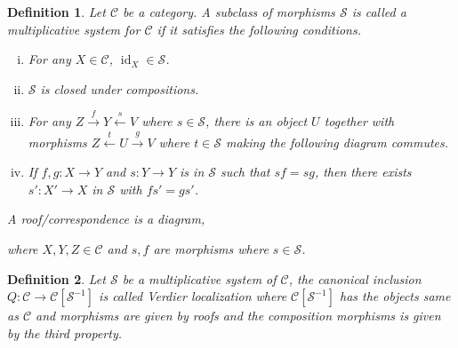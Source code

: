 \documentclass[10pt]{article}
\numberwithin{equation}{section}
\newtheorem{definition}{Definition}[section]
\DeclareMathOperator{\id}{id}
\newcommand{\sC}[0]{\mathscr{C}}
\begin{document}
\begin{definition}
    Let $\sC$ be a category. A subclass of morphisms $\mathcal{S}$ is called a multiplicative system for $\sC$ if it satisfies the following conditions.
    \begin{enumerate}[i. ]
        \item For any $X\in\sC$, $\id_X\in\mathcal{S}$.
        \item $\mathcal{S}$ is closed under compositions.
        \item For any $Z\stackrel{f}{\rightarrow}Y\stackrel{s}{\leftarrow}V$ where $s\in\mathcal{S}$, there is an object $U$ together with morphisms $Z\stackrel{t}{\leftarrow}U\stackrel{g}{\rightarrow}V$ where $t\in\mathcal{S}$ making the following diagram commutes.
        \begin{center}
        \end{center}
        \item If $f,g:X\to Y$ and $s:Y\to Y$ is in $\mathcal{S}$ such that $sf = sg$, then there exists $s':X'\to X$ in $\mathcal{S}$ with $fs' = gs'$.
    \end{enumerate}
    A roof/correspondence is a diagram,
    \begin{center}
    \end{center}
    where $X,Y,Z\in\sC$ and $s,f$ are morphisms where $s\in\mathcal{S}$.
\end{definition}

\begin{definition}
    Let $\mathcal{S}$ be a multiplicative system of $\sC$, the canonical inclusion $Q:\sC\to \sC[\mathcal{S}^{-1}]$ is called Verdier localization where $\sC[\mathcal{S}^{-1}]$ has the objects same as $\sC$ and morphisms are given by roofs and the composition morphisms is given by the third property.
\end{definition}
\end{document}
